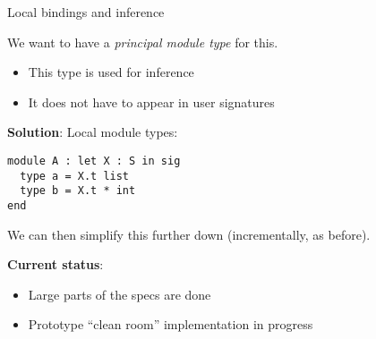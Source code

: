 \documentclass[aspectratio=169,dvipsnames,svgnames,10pt]{beamer}
\begin{document}
\begin{frame}{Local bindings and inference}

  We want to have a \emph{principal module type} for this.
  \begin{itemize}
  \item This type is used for inference
  \item It does not have to appear in user signatures
  \end{itemize}
  \pause
  
  {\bf Solution}: Local module types:
\begin{verbatim}
module A : let X : S in sig
  type a = X.t list
  type b = X.t * int
end
\end{verbatim}

  We can then simplify this further down (incrementally, as before).
\end{frame}

\begin{frame}

  {\bf Current status}:
  \begin{itemize}
  \item Large parts of the specs are done
  \item Prototype ``clean room'' implementation in progress
  \end{itemize}
 
\end{frame}
\end{document}
